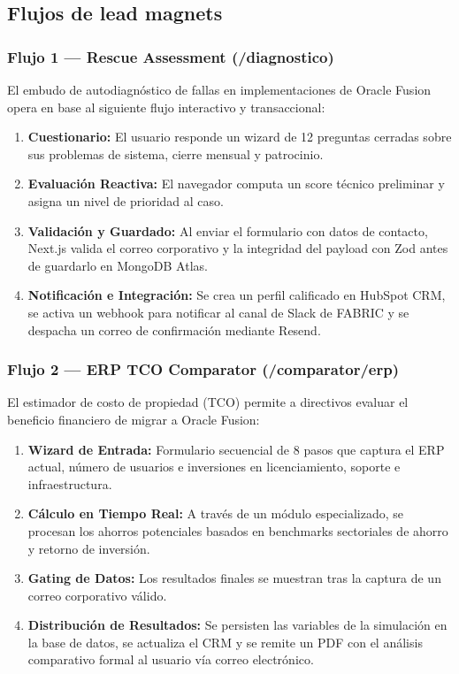 \documentclass[11pt,letterpaper]{article}
\begin{document}
\subsection{Flujos de lead magnets}

\subsubsection{Flujo 1 — Rescue Assessment (/diagnostico)}
El embudo de autodiagnóstico de fallas en implementaciones de Oracle Fusion opera en base al siguiente flujo interactivo y transaccional:
\begin{enumerate}
\item \textbf{Cuestionario:} El usuario responde un wizard de 12 preguntas cerradas sobre sus problemas de sistema, cierre mensual y patrocinio.
\item \textbf{Evaluación Reactiva:} El navegador computa un score técnico preliminar y asigna un nivel de prioridad al caso.
\item \textbf{Validación y Guardado:} Al enviar el formulario con datos de contacto, Next.js valida el correo corporativo y la integridad del payload con Zod antes de guardarlo en MongoDB Atlas.
\item \textbf{Notificación e Integración:} Se crea un perfil calificado en HubSpot CRM, se activa un webhook para notificar al canal de Slack de FABRIC y se despacha un correo de confirmación mediante Resend.
\end{enumerate}

\subsubsection{Flujo 2 — ERP TCO Comparator (/comparator/erp)}
El estimador de costo de propiedad (TCO) permite a directivos evaluar el beneficio financiero de migrar a Oracle Fusion:
\begin{enumerate}
\item \textbf{Wizard de Entrada:} Formulario secuencial de 8 pasos que captura el ERP actual, número de usuarios e inversiones en licenciamiento, soporte e infraestructura.
\item \textbf{Cálculo en Tiempo Real:} A través de un módulo especializado, se procesan los ahorros potenciales basados en benchmarks sectoriales de ahorro y retorno de inversión.
\item \textbf{Gating de Datos:} Los resultados finales se muestran tras la captura de un correo corporativo válido.
\item \textbf{Distribución de Resultados:} Se persisten las variables de la simulación en la base de datos, se actualiza el CRM y se remite un PDF con el análisis comparativo formal al usuario vía correo electrónico.
\end{enumerate}
\end{document}
